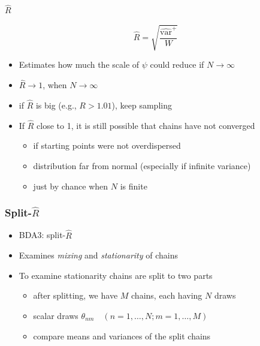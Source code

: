 \documentclass[finnish,english,t]{beamer}
\DeclareMathOperator{\var}{var}
\begin{document}
\begin{frame}{$\widehat{R}$}

  \begin{equation*}
      \widehat{R}=\sqrt{\frac{\widehat{\var}^{+}}{W}}
    \end{equation*}
    \begin{itemize}
    \item<1-> Estimates how much the scale of $\psi$ could reduce if $N\rightarrow\infty$
    \item<1-> $\widehat{R}\rightarrow 1$, when $N\rightarrow\infty$
    \item<1-> if $\widehat{R}$ is big (e.g., $R>1.01$), keep sampling
    \item<2-> If $\widehat{R}$ close to 1, it is still possible that chains have not converged
      \begin{itemize}
      \item if starting points were not overdispersed
      \item distribution far from normal (especially if infinite variance)
      \item just by chance when $N$ is finite
      \end{itemize}
    \end{itemize}  

\end{frame}

\begin{frame}[fragile]
  \frametitle{Split-$\widehat{R}$}

  \begin{itemize}
  \item BDA3: split-$\widehat{R}$
  \item Examines {\it mixing} and {\it stationarity} of chains
  \item To examine stationarity chains are split to two parts
    \begin{itemize}
    \item after splitting, we have $M$ chains, each having $N$ draws
    \item scalar draws $\theta_{nm} \quad (n=1,\ldots,N;m=1,\ldots,M)$
    \item compare means and variances of the split chains
    \end{itemize}
  \end{itemize}  

\end{frame}
\end{document}
